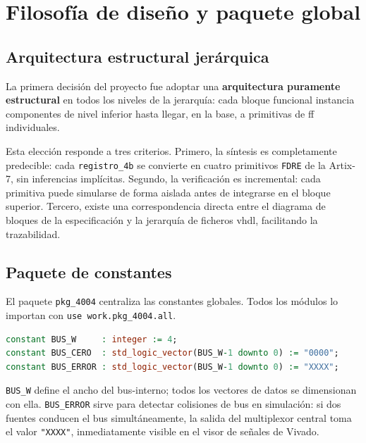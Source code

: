 \documentclass[%
    school=etsisi,%
    type=pfg,%
    degree=61CI,%
]{upm-report}
\newcommand{\vhdlfile}[1]{%
    \par\noindent{\small\sffamily\color{gray}Fichero: \texttt{#1}}\par\smallskip
}
\begin{document}
\section{Filosofía de diseño y paquete global}
\label{s:estructura}

\subsection{Arquitectura estructural jerárquica}

La primera decisión del proyecto fue adoptar una \textbf{arquitectura
puramente estructural} en todos los niveles de la jerarquía: cada bloque
funcional instancia componentes de nivel inferior hasta llegar, en la base,
a primitivas de \acrfull{ff} individuales.

Esta elección responde a tres criterios.  Primero, la síntesis es
completamente predecible: cada \texttt{registro\_4b} se convierte en cuatro
primitivos \texttt{FDRE} de la Artix-7, sin inferencias implícitas.  Segundo,
la verificación es incremental: cada primitiva puede simularse de forma
aislada antes de integrarse en el bloque superior.  Tercero, existe una
correspondencia directa entre el diagrama de bloques de la especificación y
la jerarquía de ficheros \acrshort{vhdl}, facilitando la trazabilidad.

\subsection{Paquete de constantes}
\vhdlfile{pkg\_4004.vhd}

El paquete \texttt{pkg\_4004} centraliza las constantes globales.  Todos
los módulos lo importan con \texttt{use work.pkg\_4004.all}.

\begin{lstlisting}[language=VHDL, caption={Contenido del paquete \texttt{pkg\_4004}},
    label=lst:pkg4004]
constant BUS_W     : integer := 4;
constant BUS_CERO  : std_logic_vector(BUS_W-1 downto 0) := "0000";
constant BUS_ERROR : std_logic_vector(BUS_W-1 downto 0) := "XXXX";
\end{lstlisting}

\texttt{BUS\_W} define el ancho del \gls{bus-interno}; todos los vectores
de datos se dimensionan con ella.  \texttt{BUS\_ERROR} sirve para detectar
colisiones de bus en simulación: si dos fuentes conducen el bus
simultáneamente, la salida del multiplexor central toma el valor
\texttt{"XXXX"}, inmediatamente visible en el visor de señales de Vivado.
\end{document}
